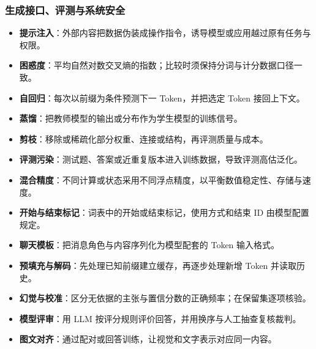 \subsubsection*{生成接口、评测与系统安全}
\begin{itemize}
\item \textbf{提示注入}：外部内容把数据伪装成操作指令，诱导模型或应用越过原有任务与权限。 
\item \textbf{困惑度}：平均自然对数交叉熵的指数；比较时须保持分词与计分数据口径一致。 
\item \textbf{自回归}：每次以前缀为条件预测下一 Token，并把选定 Token 接回上下文。 
\item \textbf{蒸馏}：把教师模型的输出或分布作为学生模型的训练信号。 
\item \textbf{剪枝}：移除或稀疏化部分权重、连接或结构，再评测质量与成本。 
\item \textbf{评测污染}：测试题、答案或近重复版本进入训练数据，导致评测高估泛化。 
\item \textbf{混合精度}：不同计算或状态采用不同浮点精度，以平衡数值稳定性、存储与速度。 
\item \textbf{开始与结束标记}：词表中的开始或结束标记，使用方式和结束 ID 由模型配置规定。 
\item \textbf{聊天模板}：把消息角色与内容序列化为模型配套的 Token 输入格式。 
\item \textbf{预填充与解码}：先处理已知前缀建立缓存，再逐步处理新增 Token 并读取历史。 
\item \textbf{幻觉与校准}：区分无依据的主张与置信分数的正确频率；在保留集逐项核验。 
\item \textbf{模型评审}：用 LLM 按评分规则评价回答，并用换序与人工抽查复核裁判。 
\item \textbf{图文对齐}：通过配对或回答训练，让视觉和文字表示对应同一内容。 
\end{itemize}

